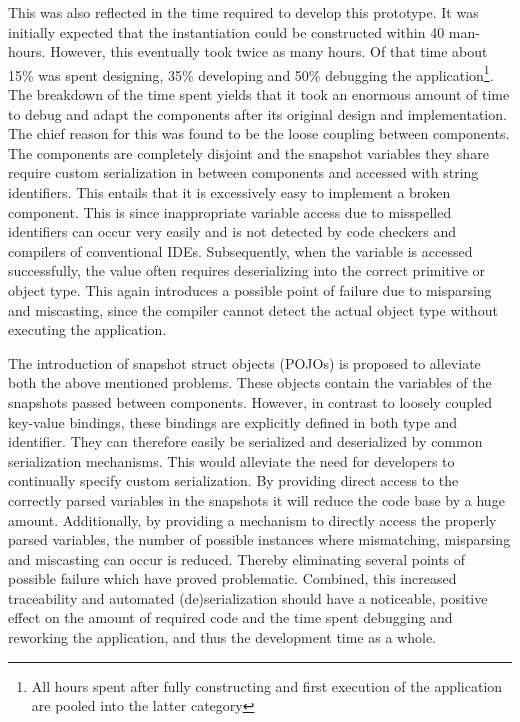 This was also reflected in the time required to develop this prototype. It was initially expected that the instantiation could be constructed within 40 man-hours. However, this eventually took twice as many hours. Of that time about 15\% was spent designing, 35\% developing and 50\% debugging the application\footnote{All hours spent after fully constructing and first execution of the application are pooled into the latter category}. The breakdown of the time spent yields that it took an enormous amount of time to debug and adapt the components after its original design and implementation. The chief reason for this was found to be the loose coupling between components. The components are completely disjoint and the snapshot variables they share require custom serialization in between components and accessed with string identifiers. This entails that it is excessively easy to implement a broken component. This is since inappropriate variable access due to misspelled identifiers can occur very easily and is not detected by code checkers and compilers of conventional IDEs. Subsequently, when the variable is accessed successfully, the value often requires deserializing into the correct primitive or object type. This again introduces a possible point of failure due to misparsing and miscasting, since the compiler cannot detect the actual object type without executing the application.

The introduction of snapshot struct objects (POJOs) is proposed to alleviate both the above mentioned problems. These objects contain the variables of the snapshots passed between components. However, in contrast to loosely coupled key-value bindings, these bindings are explicitly defined in both type and identifier. They can therefore easily be serialized and deserialized by common serialization mechanisms. This would alleviate the need for developers to continually specify custom serialization. By providing direct access to the correctly parsed variables in the snapshots it will reduce the code base by a huge amount. Additionally, by providing a mechanism to directly access the properly parsed variables, the number of possible instances where mismatching, misparsing and miscasting can occur is reduced. Thereby eliminating several points of possible failure which have proved problematic. Combined, this increased traceability and automated (de)serialization should have a noticeable, positive effect on the amount of required code and the time spent debugging and reworking the application, and thus the development time as a whole.

